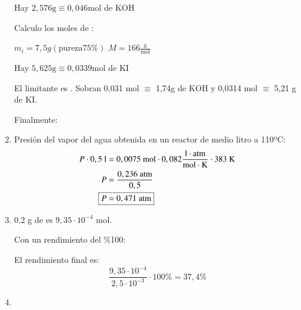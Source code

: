 \begin{enumerate}
\hfil
Hay $2,576\text{g} \equiv 0,046 \text{mol}$ de KOH
\hfil

Calculo los moles de :

\hfil $m_i = 7,5g (\text{pureza}75\%)$
\hfil $M = 166\frac{\text{g}}{\text{mol}}$
\hfil

\hfil
Hay $5,625\text{g} \equiv 0,0339 \text{mol}$ de KI
\hfil

El limitante es . Sobran 0,031 mol $\equiv$ 1,74g de KOH y 0,0314 mol $\equiv$ 5,21 g de KI.

Finalmente: 

\hfil
{}
\hfil


\item Presión del vapor del agua obtenida en un reactor de medio litro a 110ºC:
\begin{align*}
    P \cdot 0,5 \text{ l} &= 0,0075 \text{ mol} \cdot 0,082 \frac{\text{l}\cdot \text{atm}}{\text{mol} \cdot \text{K}} \cdot 383 \text{ K}\\
    P &= \dfrac{0,236 \text{ atm}}{0,5}\\
    \Aboxed{P &= 0,471\text{ atm}}
\end{align*}


\newpage
\item 0,2 g de  es $9,35\cdot 10^{-4}$ mol.

Con un rendimiento del \%100:

El rendimiento final es:
$$\dfrac{9,35\cdot 10^{-4}}{2,5 \cdot 10^{-3}}\cdot 100\% = 37,4\%
$$


\item 
\end{enumerate}
